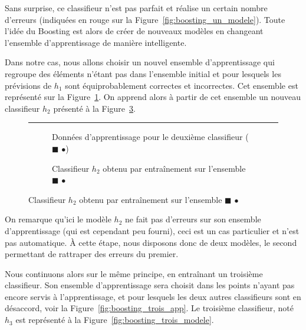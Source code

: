 Sans surprise, ce classifieur n'est pas parfait et réalise un certain nombre d'erreurs (indiquées en rouge sur la Figure~\ref{fig:boosting_un_modele}). Toute l'idée du Boosting est alors de créer de nouveaux modèles en changeant l'ensemble d'apprentissage de manière \og intelligente\fg. 

Dans notre cas, nous allons choisir un nouvel ensemble d'apprentissage qui regroupe des éléments n'étant pas dans l'ensemble initial et pour lesquels les prévisions de $h_1$ sont équiprobablement correctes et incorrectes. Cet ensemble est représenté sur la Figure~\ref{fig:boosting_deux_app}. On apprend alors à partir de cet ensemble un nouveau classifieur $h_2$ présenté à la Figure~\ref{fig:boosting_deux_modele}.

\begin{figure}[h]
	\begin{margincap}
		\rule{\textwidth}{0pt}
	\caption{Deuxième modèle appris sur les données (d'après~\cite{bib:elghazel})}
	\end{margincap}
	\begin{subfigure}{.45\textwidth}
		
		\caption{Données d'apprentissage pour le deuxième classifieur ($\blacksquare$ \large{$\bullet$})}
		\label{fig:boosting_deux_app}
	\end{subfigure}\hfill
	\begin{subfigure}{.45\textwidth}
		
		\caption{Classifieur $h_2$ obtenu par entraînement sur l'ensemble $\blacksquare$ \large{$\bullet$}}
		\label{fig:boosting_deux_modele}
	\end{subfigure}\hfill
\end{figure}

On remarque qu'ici le modèle $h_2$ ne fait pas d'erreurs sur son ensemble d'apprentissage (qui est cependant peu fourni), ceci est un cas particulier et n'est pas automatique. À cette étape, nous disposons donc de deux modèles, le second permettant de \og rattraper\fg{} des erreurs du premier.

Nous continuons alors sur le même principe, en entraînant un troisième classifieur. Son ensemble d'apprentissage sera choisit dans les points n'ayant pas encore servis à l'apprentissage, et pour lesquels les deux autres classifieurs sont en désaccord, voir la Figure~\ref{fig:boosting_trois_app}. Le troisième classifieur, noté $h_3$ est représenté à la Figure~\ref{fig:boosting_trois_modele}.

